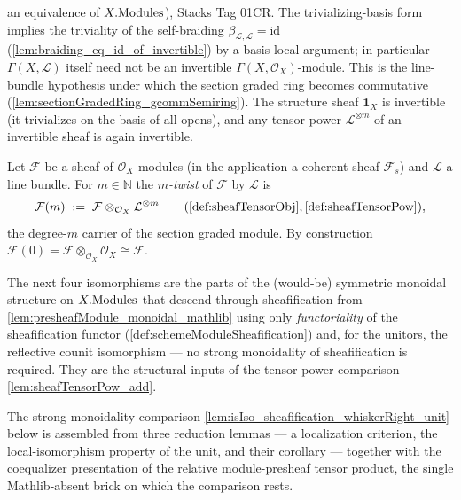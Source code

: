 \begin{definition}
  \) an equivalence of \(X.\mathrm{Modules}\)), Stacks Tag 01CR. The
  trivializing-basis form implies the triviality of the self-braiding
  \(\beta_{\mathcal{L},\mathcal{L}} = \mathrm{id}\)
  (\cref{lem:braiding_eq_id_of_invertible}) by a basis-local argument; in
  particular \(\Gamma(X,\mathcal{L})\) itself need not be an invertible
  \(\Gamma(X,\mathcal{O}_X)\)-module. This is the line-bundle hypothesis under which
  the section graded ring becomes commutative
  (\cref{lem:sectionGradedRing_gcommSemiring}). The structure sheaf \(\mathbf{1}_X\)
  is invertible (it trivializes on the basis of all opens), and any tensor power
  \(\mathcal{L}^{\otimes m}\) of an invertible sheaf is again invertible.
\end{definition}


\begin{definition}\leanok
  \label{def:sheafModuleTwist}
  Let \(\mathcal{F}\) be a sheaf of \(\mathcal{O}_X\)-modules (in the application
  a coherent sheaf \(\mathcal{F}_s\)) and \(\mathcal{L}\) a line bundle. For
  \(m \in \mathbb{N}\) the \emph{\(m\)-twist} of \(\mathcal{F}\) by
  \(\mathcal{L}\) is
  \[
    \mathcal{F}(m) \;:=\;
      \mathcal{F} \otimes_{\mathcal{O}_X} \mathcal{L}^{\otimes m}
      \qquad(\cref{def:sheafTensorObj}, \cref{def:sheafTensorPow}),
  \]
  the degree-\(m\) carrier of the section graded module. By construction
  \(\mathcal{F}(0) = \mathcal{F} \otimes_{\mathcal{O}_X} \mathcal{O}_X \cong
  \mathcal{F}\).
\end{definition}


The next four isomorphisms are the parts of the (would-be) symmetric monoidal
structure on \(X.\mathrm{Modules}\) that descend through sheafification from
\cref{lem:presheafModule_monoidal_mathlib} using only \emph{functoriality} of the
sheafification functor (\cref{def:schemeModuleSheafification}) and, for the
unitors, the reflective counit isomorphism --- no strong monoidality of
sheafification is required. They are the structural inputs of the tensor-power
comparison \cref{lem:sheafTensorPow_add}.


The strong-monoidality comparison \cref{lem:isIso_sheafification_whiskerRight_unit}
below is assembled from three reduction lemmas --- a localization criterion, the
local-isomorphism property of the unit, and their corollary --- together with the
coequalizer presentation of the relative module-presheaf tensor product, the single
Mathlib-absent brick on which the comparison rests.


